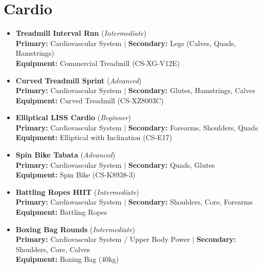 \documentclass[11pt,a4paper]{article}
\begin{document}
\section*{Cardio}
\begin{itemize}[leftmargin=*]
  \item \textbf{Treadmill Interval Run} (\textit{Intermediate})\\
        \textbf{Primary:} Cardiovascular System $|$ \textbf{Secondary:} Legs (Calves, Quads, Hamstrings)\\
        \textbf{Equipment:} Commercial Treadmill (CS-XG-V12E)
  \item \textbf{Curved Treadmill Sprint} (\textit{Advanced})\\
        \textbf{Primary:} Cardiovascular System $|$ \textbf{Secondary:} Glutes, Hamstrings, Calves\\
        \textbf{Equipment:} Curved Treadmill (CS-XZ8003C)
  \item \textbf{Elliptical LISS Cardio} (\textit{Beginner})\\
        \textbf{Primary:} Cardiovascular System $|$ \textbf{Secondary:} Forearms, Shoulders, Quads\\
        \textbf{Equipment:} Elliptical with Inclination (CS-E17)
  \item \textbf{Spin Bike Tabata} (\textit{Advanced})\\
        \textbf{Primary:} Cardiovascular System $|$ \textbf{Secondary:} Quads, Glutes\\
        \textbf{Equipment:} Spin Bike (CS-K8938-3)
  \item \textbf{Battling Ropes HIIT} (\textit{Intermediate})\\
        \textbf{Primary:} Cardiovascular System $|$ \textbf{Secondary:} Shoulders, Core, Forearms\\
        \textbf{Equipment:} Battling Ropes
  \item \textbf{Boxing Bag Rounds} (\textit{Intermediate})\\
        \textbf{Primary:} Cardiovascular System / Upper Body Power $|$ \textbf{Secondary:} Shoulders, Core, Calves\\
        \textbf{Equipment:} Boxing Bag (40kg)
\end{itemize}
\vspace{0.5em}
\end{document}
